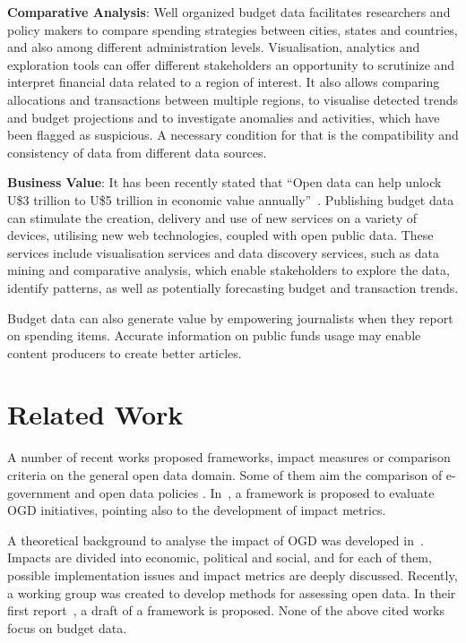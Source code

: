 \hspace{.8cm}

\noindent\textbf{Comparative Analysis}: Well organized budget data facilitates researchers and policy makers to compare spending strategies between cities, states and countries, and also among different administration levels.
Visualisation, analytics and exploration tools can offer different stakeholders an opportunity to scrutinize and interpret financial data related to a region of interest. 
It also allows comparing allocations and transactions between multiple regions, to visualise detected trends and budget projections and to investigate anomalies and activities, which have been flagged as suspicious.
A necessary condition for that is the compatibility and consistency of data from different data sources. 

\hspace{.8cm}

\noindent\textbf{Business Value}: 
It has been recently stated that ``Open data can help unlock U\$3 trillion to U\$5 trillion in economic value annually''~\cite{Manyika2013}.
Publishing budget data can stimulate the creation, delivery and use of new services on a variety of devices, utilising new web technologies, coupled with open public data. 
These services include visualisation services and data discovery services, such as data mining and comparative analysis, which enable stakeholders to explore the data, identify patterns, as well as potentially forecasting budget and transaction trends. 

Budget data can also generate value by empowering journalists when they report on spending items.
Accurate information on public funds usage may enable content producers to create better articles.



\section{Related Work}
\label{sec:relworks}

A number of recent works proposed frameworks, impact measures or comparison criteria on the general open data domain.
Some of them aim the comparison of e-government and open data policies \cite{Zuiderwijk2014, Veljkovic2014}. 
In~\cite{Ubaldi2013}, a framework is proposed to evaluate OGD initiatives, pointing also to the development of impact metrics.

A theoretical background to analyse the impact of OGD was developed in~\cite{Granickas2013}. 
Impacts are divided into economic, political and social, and for each of them, possible implementation issues and impact metrics are deeply discussed. 
Recently, a working group was created to develop methods for assessing open data. In their first report~\cite{Caplan2014}, a draft of a framework is proposed.
None of the above cited works focus on budget data.

